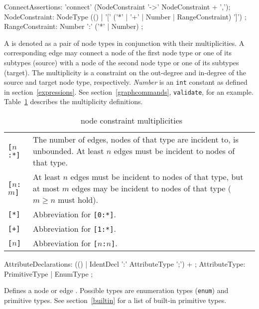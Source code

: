 \begin{rail}  
  ConnectAssertions: 'connect' (NodeConstraint '->' NodeConstraint + ',');
  NodeConstraint: NodeType (() | '[' ('*' | '+' | Number | RangeConstraint) ']') ;
  RangeConstraint: Number ':' ('*' | Number) ;
\end{rail}
A  is denoted as a pair of node types in conjunction with their multiplicities. A corresponding edge may connect a node of the first node type or one of its subtypes (source) with a node of the second node type or one of its subtypes (target). The multiplicity is a constraint on the out-degree and in-degree of the source and target node type, respectively. \emph{Number} is an \texttt{int} constant as defined in section~\ref{expressions}. See section~\ref{graphcommands}, \texttt{validate}, for an example. Table~\ref{multiplicities} describes the multiplicity definitions.
\begin{table}[htbp]
\begin{tabularx}{\linewidth}{|l|X|}\hline
	\texttt{[$n$:*]} & The number of edges, nodes of that type are incident to, is unbounded. At least $n$ edges must be incident to nodes of that type.\\ 
	\texttt{[$n$:$m$]} & At least $n$ edges must be incident to nodes of that type, but at most $m$ edges may be incident to nodes of that type ($m \geq n$ must hold).\\
	\texttt{[*]} & Abbreviation for \texttt{[0:*]}.\\
	\texttt{[+]} & Abbreviation for \texttt{[1:*]}.\\
	\texttt{[$n$]} & Abbreviation for \texttt{[$n$:$n$]}. \\ \hline
\end{tabularx}
\caption{\GrG\ node constraint multiplicities}
\label{multiplicities}
\end{table}

\begin{rail}    
  AttributeDeclarations: (() | IdentDecl ':' AttributeType ';') + ;
  AttributeType: PrimitiveType | EnumType ; 
\end{rail}
Defines a node or edge . Possible types are enumeration types (\texttt{enum}) and primitive types. See section~\ref{builtin} for a list of built-in primitive types.




